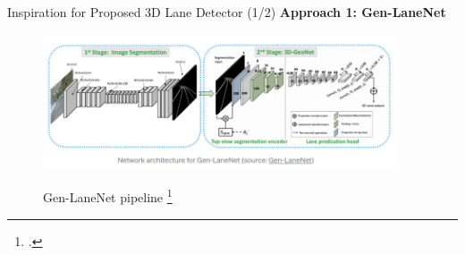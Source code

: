 \documentclass[aspectratio=169]{beamer}
\begin{document}
\begin{frame}{Inspiration for Proposed 3D Lane Detector (1/2)}
\textbf{Approach 1: Gen-LaneNet}

 \begin{figure}[H]
     \centering
     
\includegraphics[width=0.8\linewidth, height=4cm]{images/genLanenet.png} 
\label{fig:subim1}

\caption{Gen-LaneNet pipeline \footcite{guo2020gen} }
\label{fig:image2}
\end{figure}
\end{frame}

\end{document}
